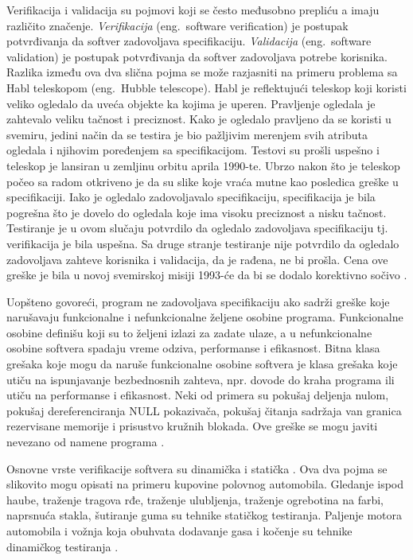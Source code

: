 \documentclass[12pt,oneside]{memoir}
\begin{document}
Verifikacija i validacija su pojmovi koji se često međusobno prepliću a imaju različito značenje. \textit{Verifikacija} (eng.~software verification) je postupak potvrđivanja da softver zadovoljava specifikaciju. \textit{Validacija} (eng.~software validation) je postupak potvrđivanja da softver zadovoljava potrebe korisnika. %
Razlika između ova dva slična pojma se može razjasniti na primeru problema sa Habl teleskopom (eng.~Hubble telescope). Habl je reflektujući teleskop koji koristi veliko ogledalo da uveća objekte ka kojima je uperen. Pravljenje ogledala je zahtevalo veliku tačnost i preciznost. Kako je ogledalo pravljeno da se koristi u svemiru, jedini način da se testira je bio pažljivim merenjem svih atributa ogledala i njihovim poređenjem sa specifikacijom. Testovi su prošli uspešno i teleskop je lansiran u zemljinu orbitu aprila 1990-te. Ubrzo nakon što je teleskop počeo sa radom otkriveno je da su slike koje vraća mutne kao posledica greške u specifikaciji. Iako je ogledalo zadovoljavalo specifikaciju, specifikacija je bila pogrešna što je dovelo do ogledala koje ima visoku preciznost a nisku tačnost. Testiranje je u ovom slučaju potvrdilo da ogledalo zadovoljava specifikaciju tj. verifikacija je bila uspešna. Sa druge stranje testiranje nije potvrdilo da ogledalo zadovoljava zahteve korisnika i validacija, da je rađena, ne bi prošla. Cena ove greške je bila u novoj svemirskoj misiji 1993-će da bi se dodalo korektivno sočivo \cite{SoftTest}.

Uopšteno govoreći, program ne zadovoljava specifikaciju ako sadrži greške koje narušavaju funkcionalne i nefunkcionalne željene osobine programa. Funkcionalne osobine definišu koji su to željeni izlazi za zadate ulaze, a u nefunkcionalne osobine softvera spadaju vreme odziva, performanse i efikasnost. Bitna klasa grešaka koje mogu da naruše funkcionalne osobine softvera je klasa grešaka koje utiču na ispunjavanje bezbednosnih zahteva, npr. dovode do kraha programa ili utiču na performanse i efikasnost. Neki od primera su pokušaj deljenja nulom, pokušaj dereferenciranja NULL pokazivača, pokušaj čitanja sadržaja van granica rezervisane memorije i prisustvo kružnih blokada. Ove greške se mogu javiti nevezano od namene programa  \cite{mvj}.

Osnovne vrste verifikacije softvera su dinamička i statička  \cite{mvj}. Ova dva pojma se slikovito mogu opisati na primeru kupovine polovnog automobila. Gledanje ispod haube, traženje tragova rđe, traženje ulubljenja, traženje ogrebotina na farbi, naprsnuća stakla, šutiranje guma su tehnike statičkog testiranja. Paljenje motora automobila i vožnja koja obuhvata dodavanje gasa i kočenje su tehnike dinamičkog testiranja \cite{SoftTest}.
\end{document}
